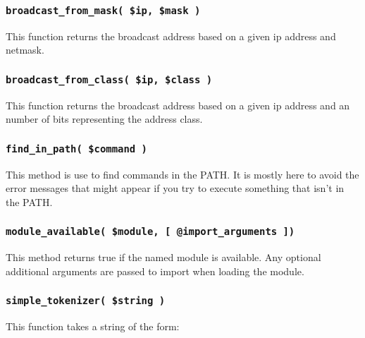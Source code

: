 \documentclass[12pt,a4paper]{article}
\begin{document}
\subsubsection*{\texttt{broadcast\_from\_mask( \$ip, \$mask )}\label{xPL::Base_broadcast_from_mask_ip_mask_}}


This function returns the broadcast address based on a given ip address
and netmask.

\subsubsection*{\texttt{broadcast\_from\_class( \$ip, \$class )}\label{xPL::Base_broadcast_from_class_ip_class_}}


This function returns the broadcast address based on a given ip address
and an number of bits representing the address class.

\subsubsection*{\texttt{find\_in\_path( \$command )}\label{xPL::Base_find_in_path_command_}}


This method is use to find commands in the PATH.  It is mostly
here to avoid the error messages that might appear if you try
to execute something that isn't in the PATH.

\subsubsection*{\texttt{module\_available( \$module, [ @import\_arguments ])}\label{xPL::Base_module_available_module_import_arguments_}}


This method returns true if the named module is available.
Any optional additional arguments are passed to import
when loading the module.

\subsubsection*{\texttt{simple\_tokenizer( \$string )}\label{xPL::Base_simple_tokenizer_string_}}


This function takes a string of the form:
\end{document}
